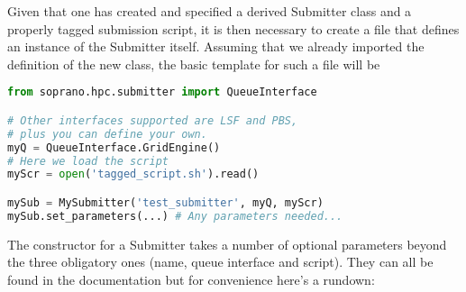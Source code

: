 \documentclass[]{report}
\begin{document}
Given that one has created and specified a derived Submitter class and a properly tagged submission script, it is then necessary to create a file that defines an instance of the Submitter itself. Assuming that we already imported the definition of the new class, the basic template for such a file will be

\begin{lstlisting}[language=python]
from soprano.hpc.submitter import QueueInterface

# Other interfaces supported are LSF and PBS,
# plus you can define your own.
myQ = QueueInterface.GridEngine() 
# Here we load the script
myScr = open('tagged_script.sh').read()

mySub = MySubmitter('test_submitter', myQ, myScr)
mySub.set_parameters(...) # Any parameters needed...
\end{lstlisting}

The constructor for a Submitter takes a number of optional parameters beyond the three obligatory ones (name, queue interface and script). They can all be found in the documentation but for convenience here's a rundown:
\end{document}
